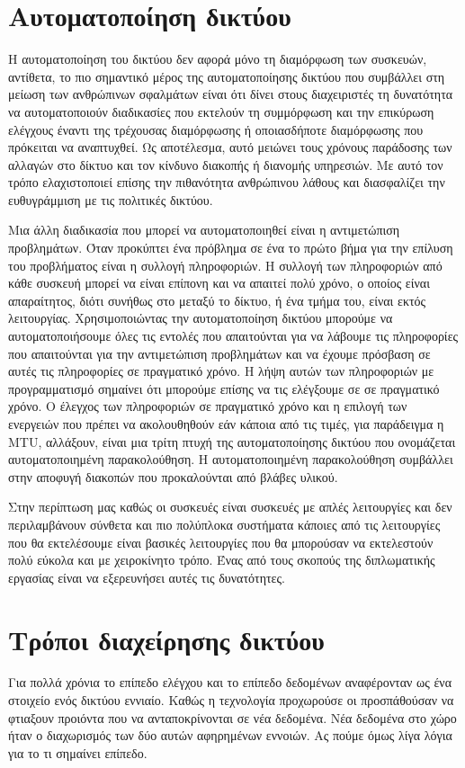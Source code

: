 \section{Αυτοματοποίηση δικτύου}
Η αυτοματοποίηση του δικτύου δεν αφορά μόνο τη διαμόρφωση των συσκευών, αντίθετα, το πιο σημαντικό μέρος της αυτοματοποίησης δικτύου που συμβάλλει στη μείωση των ανθρώπινων σφαλμάτων είναι ότι δίνει στους
διαχειριστές τη δυνατότητα να αυτοματοποιούν διαδικασίες που εκτελούν τη συμμόρφωση και την επικύρωση  ελέγχους έναντι της τρέχουσας διαμόρφωσης ή οποιασδήποτε διαμόρφωσης που πρόκειται να αναπτυχθεί. 
Ως αποτέλεσμα, αυτό μειώνει τους χρόνους παράδοσης των αλλαγών στο δίκτυο και τον κίνδυνο διακοπής ή διανομής υπηρεσιών. Με αυτό τον τρόπο ελαχιστοποιεί επίσης την πιθανότητα ανθρώπινου λάθους και διασφαλίζει την ευθυγράμμιση με τις πολιτικές δικτύου.

Μια άλλη διαδικασία που μπορεί να αυτοματοποιηθεί είναι η αντιμετώπιση προβλημάτων. Όταν προκύπτει ένα πρόβλημα σε ένα 
το πρώτο βήμα για την επίλυση του προβλήματος είναι η συλλογή πληροφοριών. Η συλλογή των πληροφοριών από κάθε συσκευή μπορεί να είναι επίπονη και να απαιτεί πολύ χρόνο, ο οποίος είναι απαραίτητος, διότι συνήθως στο μεταξύ το δίκτυο, ή ένα τμήμα του, είναι εκτός λειτουργίας.
Χρησιμοποιώντας την αυτοματοποίηση δικτύου μπορούμε να αυτοματοποιήσουμε όλες τις εντολές που απαιτούνται για να λάβουμε τις πληροφορίες που απαιτούνται για την αντιμετώπιση προβλημάτων και να έχουμε πρόσβαση σε αυτές τις πληροφορίες σε πραγματικό χρόνο.
Η λήψη αυτών των πληροφοριών με προγραμματισμό σημαίνει ότι μπορούμε επίσης να τις ελέγξουμε σε  σε πραγματικό χρόνο. Ο έλεγχος των πληροφοριών σε πραγματικό χρόνο και η 
επιλογή των ενεργειών που πρέπει να ακολουθηθούν εάν κάποια από τις τιμές, για παράδειγμα η MTU, αλλάξουν, 
είναι μια τρίτη πτυχή της αυτοματοποίησης δικτύου που ονομάζεται αυτοματοποιημένη παρακολούθηση.
Η αυτοματοποιημένη παρακολούθηση συμβάλλει στην αποφυγή διακοπών που προκαλούνται από βλάβες υλικού.

Στην περίπτωση μας καθώς οι συσκευές είναι συσκευές με απλές λειτουργίες και δεν περιλαμβάνουν σύνθετα και πιο πολύπλοκα συστήματα κάποιες από τις λειτουργίες
που θα εκτελέσουμε είναι βασικές λειτουργίες που θα μπορούσαν να εκτελεστούν πολύ εύκολα και με χειροκίνητο τρόπο. Ένας από τους σκοπούς της διπλωματικής εργασίας
είναι να εξερευνήσει αυτές τις δυνατότητες.

\section{Τρόποι διαχείρησης δικτύου}
Για πολλά χρόνια το επίπεδο ελέγχου και το επίπεδο δεδομένων αναφέρονταν ως ένα στοιχείο ενός δικτύου εννιαίο. Καθώς η τεχνολογία προχωρούσε οι 
προσπάθούσαν να φτιαξουν προιόντα που να ανταποκρίνονται σε νέα δεδομένα. Νέα δεδομένα στο χώρο ήταν ο διαχωρισμός των δύο αυτών αφηρημένων εννοιών.
Ας πούμε όμως λίγα λόγια για το τι σημαίνει επίπεδο. 

